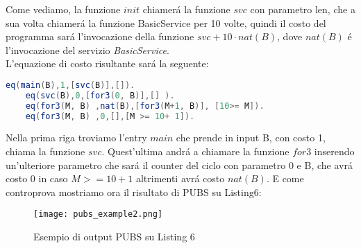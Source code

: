 \documentclass[../../main.tex]{subfiles}
\begin{document}
Come vediamo, la funzione $init$ chiamerá la funzione $svc$ con parametro len, che a sua volta chiamerá la funzione BasicService per 10 volte, quindi il costo del programma sará l'invocazione della funzione $svc + 10 \cdot nat(B)$, dove $nat(B)$ é l'invocazione del servizio \textit{BasicService}.\\
L'equazione di costo risultante sará la seguente:
\begin{lstlisting}[language=Java,caption={Equazione di costo PUBS per Listing6}]
    eq(main(B),1,[svc(B)],[]).
    eq(svc(B),0,[for3(0, B)],[] ).
    eq(for3(M, B) ,nat(B),[for3(M+1, B)], [10>= M]).
    eq(for3(M, B) ,0,[],[M >= 10+ 1]).
\end{lstlisting}

Nella prima riga troviamo l'entry $main$ che prende in input B, con costo 1, chiama la funzione $svc$.
Quest'ultima andrá a chiamare la funzione $for3$ inserendo un'ulteriore parametro che sará il counter del ciclo con parametro 0 e B, che avrá costo 0 in caso $M >= 10 + 1$ altrimenti avrá costo $nat(B)$.
E come controprova mostriamo ora il risultato di PUBS su Listing6:
\begin{figure}[H]
    \centering
    \texttt{[image: pubs\_example2.png]}
    \caption{Esempio di output PUBS su Listing 6}
\end{figure}
\end{document}
